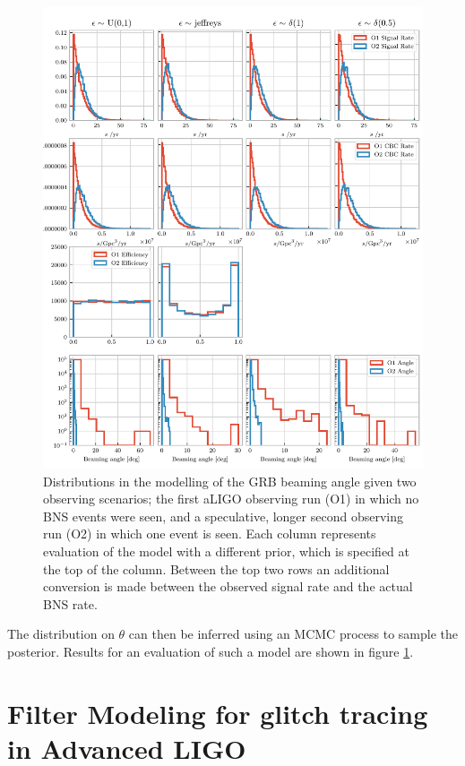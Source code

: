 \documentclass[openleft]{kentigern}
\theoremstyle{definition}
\begin{document}
\begin{figure}
  \centering
  \includegraphics{figures/grbbeamingpymc.pdf}
  \caption{Distributions in the modelling of the GRB beaming angle
    given two observing scenarios; the first aLIGO observing run (O1)
    in which no BNS events were seen, and a speculative, longer second
    observing run (O2) in which one event is seen. Each column
    represents evaluation of the model with a different prior, which
    is specified at the top of the column. Between the top two rows an
    additional conversion is made between the observed signal rate and
    the actual BNS rate.}
  \label{fig:grb-distributions}
\end{figure}

The distribution on $\theta$ can then be inferred using an MCMC
process to sample the posterior. Results for an evaluation of such a
model are shown in figure \ref{fig:grb-distributions}.


%
% 

\section{Filter Modeling for glitch tracing in Advanced LIGO}
\label{sec:glitchtracing}
\end{document}
